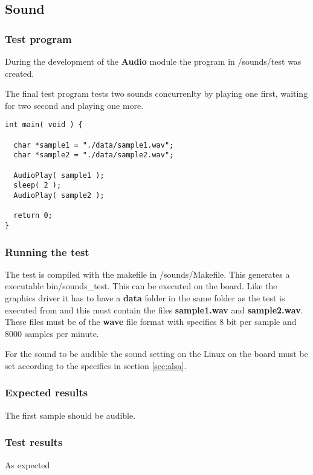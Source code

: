 \subsection{Sound}

\subsubsection{Test program}
During the development of the {\bf Audio} module the program in /sounds/test was created.

The final test program tests two sounds concurrenlty by playing one first, waiting
for two second and playing one more.

\begin{lstlisting}
int main( void ) {

  char *sample1 = "./data/sample1.wav";
  char *sample2 = "./data/sample2.wav";

  AudioPlay( sample1 );
  sleep( 2 );
  AudioPlay( sample2 );

  return 0;
}

\end{lstlisting}

\subsubsection{Running the test}
The test is compiled with the makefile in /sounds/Makefile. This generates a executable
bin/sounds\_test. This can be executed on the board. Like the graphics driver it has to
have a {\bf data} folder in the same folder as the test is executed from and this must
contain the files {\bf sample1.wav} and {\bf sample2.wav}. These files must be of the
{\bf wave} file format with specifics 8 bit per sample and 8000 samples per minute.

For the sound to be audible the sound setting on the Linux on the board must be set according
to the specifics in section \ref{sec:alsa}.

\subsubsection{Expected results}
The first sample should be audible.

\subsubsection{Test results}
As expected
